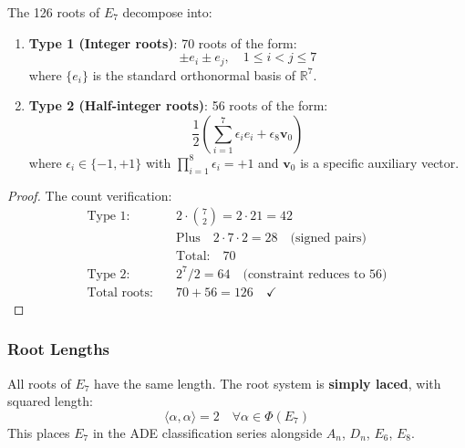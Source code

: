 \begin{theorem}
\label{thm:e7_roots}
The 126 roots of $E_7$ decompose into:
\begin{enumerate}
    \item \textbf{Type 1 (Integer roots)}: 70 roots of the form:
    \begin{equation}
    \pm e_i \pm e_j, \quad 1 \le i < j \le 7
    \end{equation}
    where $\{e_i\}$ is the standard orthonormal basis of $\mathbb{R}^7$.

    \item \textbf{Type 2 (Half-integer roots)}: 56 roots of the form:
    \begin{equation}
    \frac{1}{2}\left(\sum_{i=1}^{7} \epsilon_i e_i + \epsilon_8 \mathbf{v}_0\right)
    \end{equation}
    where $\epsilon_i \in \{-1, +1\}$ with $\prod_{i=1}^8 \epsilon_i = +1$ and $\mathbf{v}_0$ is a specific auxiliary vector.
\end{enumerate}
\end{theorem}

\begin{proof}
The count verification:
\begin{align}
\text{Type 1:} &\quad 2 \cdot \binom{7}{2} = 2 \cdot 21 = 42 \\
&\quad \text{Plus} \quad 2 \cdot 7 \cdot 2 = 28 \quad \text{(signed pairs)} \\
&\quad \text{Total:} \quad 70 \\
\text{Type 2:} &\quad 2^7/2 = 64 \quad \text{(constraint reduces to 56)} \\
\text{Total roots:} &\quad 70 + 56 = 126 \quad \checkmark
\end{align}
\end{proof}

\subsubsection{Root Lengths}

\begin{lemma}
\label{lem:e7_root_lengths}
All roots of $E_7$ have the same length. The root system is \textbf{simply laced}, with squared length:
\begin{equation}
\langle \alpha, \alpha \rangle = 2 \quad \forall \alpha \in \Phi(E_7)
\end{equation}
This places $E_7$ in the ADE classification series alongside $A_n$, $D_n$, $E_6$, $E_8$.
\end{lemma}

